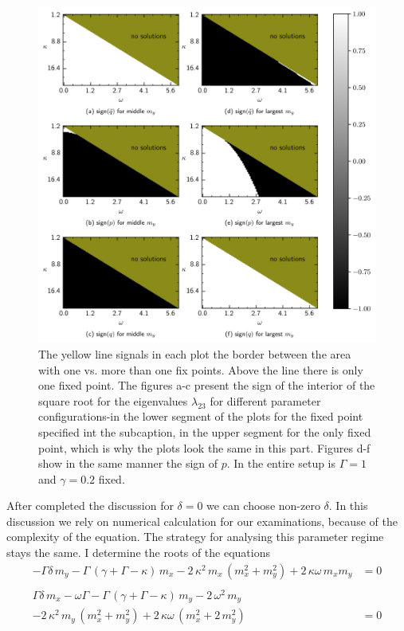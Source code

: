 \documentclass{article}
\begin{document}
\begin{figure}[H]
    \centering
    \includegraphics{pictures/lam2_anal_ml.png}
    \caption{The yellow line signals in each plot the border between the area with one vs. more than one fix points. Above the line there is only one fixed point. The figures a-c present the sign of the interior of the square root for the eigenvalues $\lambda_{23}$ for different parameter configurations-in the lower segment of the plots for the fixed point specified int the subcaption, in the upper segment for the only fixed point, which is why the plots look the same in this part. Figures d-f show in the same manner the sign of $p$. In the entire setup is $\Gamma=1$ and $\gamma=0.2$ fixed.}
\end{figure}
\newpage
After completed the discussion for $\delta=0$ we can choose non-zero $\delta$. In this discussion we rely on numerical calculation for our examinations, because of the complexity of the equation. The strategy for analysing this parameter regime stays the same. I determine the roots of the equations
\begin{align*}
    -\Gamma\delta\,m_y-\Gamma\,(\gamma+\Gamma-\kappa)\,m_x-2\,\kappa^2\,m_x\,( m_x^2+ m_y^2)+2\,\kappa\omega\,m_xm_y  &=0\\\\
    \Gamma\delta\,m_x-\omega\Gamma-\Gamma\,(\gamma+\Gamma-\kappa)\,m_y-2\,\omega^2\,m_y&\\
    -2\,\kappa^2\,m_y\,( m_x^2+ m_y^2)+2\,\kappa\omega\,(m_x^2+2\,m_y^2)  &=0
\end{align*}
\end{document}

